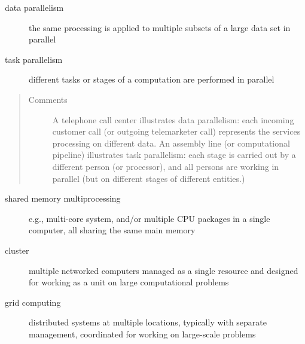 \documentclass[letterpaper,10pt,openany,oneside]{sphinxmanual}
\begin{document}
\begin{description}
\item[{data parallelism}] \leavevmode{}\label{Introduction/Introduction:term-data-parallelism}
the same processing is applied to multiple subsets of a large data set in parallel

\end{description}
\begin{description}
\item[{task parallelism}] \leavevmode{}\label{Introduction/Introduction:term-task-parallelism}
different tasks or stages of a computation are performed in parallel

\end{description}
\begin{quote}\begin{description}
\item[{Comments}] \leavevmode
A telephone call center illustrates data parallelism: each incoming customer call (or outgoing telemarketer call) represents the services processing on different data. An assembly line (or computational pipeline) illustrates task parallelism: each stage is carried out by a different person (or processor), and all persons are working in parallel (but on different stages of different entities.)

\end{description}\end{quote}
\begin{description}
\item[{shared memory multiprocessing}] \leavevmode{}\label{Introduction/Introduction:term-shared-memory-multiprocessing}
e.g., multi-core system, and/or multiple CPU packages in a single computer, all sharing the same main memory

\end{description}
\begin{description}
\item[{cluster}] \leavevmode{}\label{Introduction/Introduction:term-cluster}
multiple networked computers managed as a single resource and designed for working as a unit on large computational problems

\end{description}
\begin{description}
\item[{grid computing}] \leavevmode{}\label{Introduction/Introduction:term-grid-computing}
distributed systems at multiple locations, typically with separate management, coordinated for working on large-scale problems

\end{description}
\end{document}
